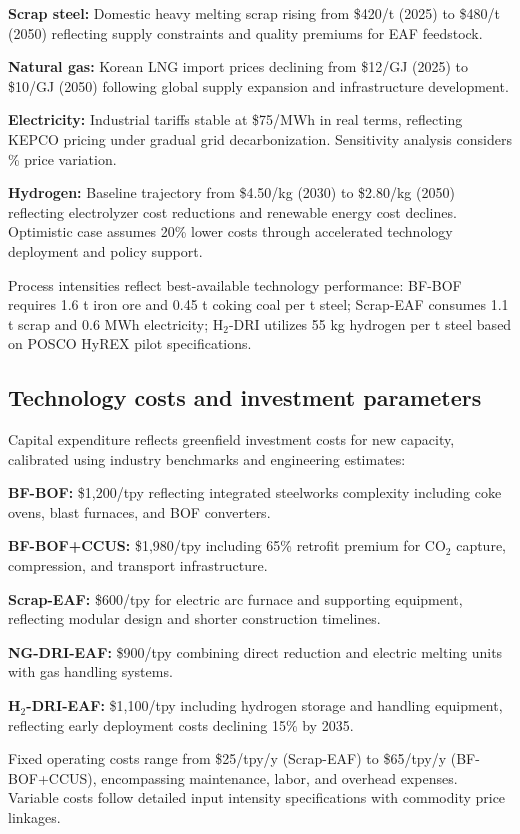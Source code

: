 \documentclass[preprint,1p,authoryear]{elsarticle}
\begin{document}
\textbf{Scrap steel:} Domestic heavy melting scrap rising from \$420/t (2025) to \$480/t (2050) reflecting supply constraints and quality premiums for EAF feedstock.

\textbf{Natural gas:} Korean LNG import prices declining from \$12/GJ (2025) to \$10/GJ (2050) following global supply expansion and infrastructure development.

\textbf{Electricity:} Industrial tariffs stable at \$75/MWh in real terms, reflecting KEPCO pricing under gradual grid decarbonization. Sensitivity analysis considers \% price variation.

\textbf{Hydrogen:} Baseline trajectory from \$4.50/kg (2030) to \$2.80/kg (2050) reflecting electrolyzer cost reductions and renewable energy cost declines. Optimistic case assumes 20\% lower costs through accelerated technology deployment and policy support.

Process intensities reflect best-available technology performance: BF-BOF requires 1.6 t iron ore and 0.45 t coking coal per t steel; Scrap-EAF consumes 1.1 t scrap and 0.6 MWh electricity; H$_2$-DRI utilizes 55 kg hydrogen per t steel based on POSCO HyREX pilot specifications.

\subsection{Technology costs and investment parameters}

Capital expenditure reflects greenfield investment costs for new capacity, calibrated using industry benchmarks and engineering estimates:

\textbf{BF-BOF:} \$1,200/tpy reflecting integrated steelworks complexity including coke ovens, blast furnaces, and BOF converters.

\textbf{BF-BOF+CCUS:} \$1,980/tpy including 65\% retrofit premium for CO$_2$ capture, compression, and transport infrastructure.

\textbf{Scrap-EAF:} \$600/tpy for electric arc furnace and supporting equipment, reflecting modular design and shorter construction timelines.

\textbf{NG-DRI-EAF:} \$900/tpy combining direct reduction and electric melting units with gas handling systems.

\textbf{H$_2$-DRI-EAF:} \$1,100/tpy including hydrogen storage and handling equipment, reflecting early deployment costs declining 15\% by 2035.

Fixed operating costs range from \$25/tpy/y (Scrap-EAF) to \$65/tpy/y (BF-BOF+CCUS), encompassing maintenance, labor, and overhead expenses. Variable costs follow detailed input intensity specifications with commodity price linkages.
\end{document}

